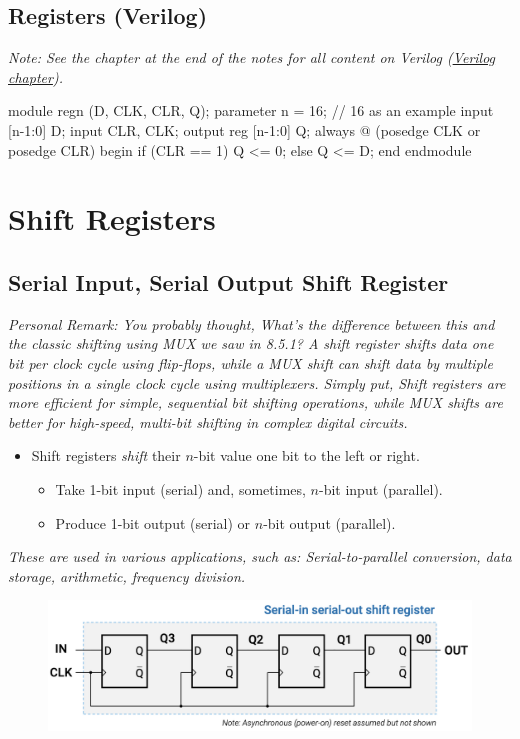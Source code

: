 \documentclass[12pt,openany]{book}
\begin{document}
\newpage 
\subsection{Registers (Verilog)}
 \textit{Note: See the chapter at the end of the notes for all content on Verilog (\hyperref[Verilog]{Verilog chapter}).}

\begin{vhdl}
module regn (D, CLK, CLR, Q);
parameter n = 16; // 16 as an example
input [n-1:0] D;
input CLR, CLK;
output reg [n-1:0] Q;
always @ (posedge CLK or posedge CLR)
	begin
		if (CLR == 1)
			Q <= 0;
	else
		Q <= D;
end
endmodule
\end{vhdl}

\section{Shift Registers}
\subsection{Serial Input, Serial Output Shift Register}
\textit{Personal Remark: You probably thought, What's the difference between this and the classic shifting using MUX we saw in 8.5.1? \newline A shift register shifts data one bit per clock cycle using flip-flops, while a MUX shift can shift data by multiple positions in a single clock cycle using multiplexers. Simply put, Shift registers are more efficient for simple, sequential bit shifting operations, while MUX shifts are better for high-speed, multi-bit shifting in complex digital circuits. }
\begin{itemize}
    \item[] Shift registers \textit{shift} their \(n\)-bit value one bit to the left or right.
    \begin{itemize}
        \item Take 1-bit input (serial) and, sometimes, \(n\)-bit input (parallel).
        \item Produce 1-bit output (serial) or \(n\)-bit output (parallel).
    \end{itemize}
\end{itemize}

\textit{These are used in various applications, such as: \newline Serial-to-parallel conversion, data storage, arithmetic, frequency division.}
\begin{figure}[h]
    \centering
    \includegraphics[width=1\textwidth]{circuits/14.1.2.png}
\end{figure}
\end{document}
